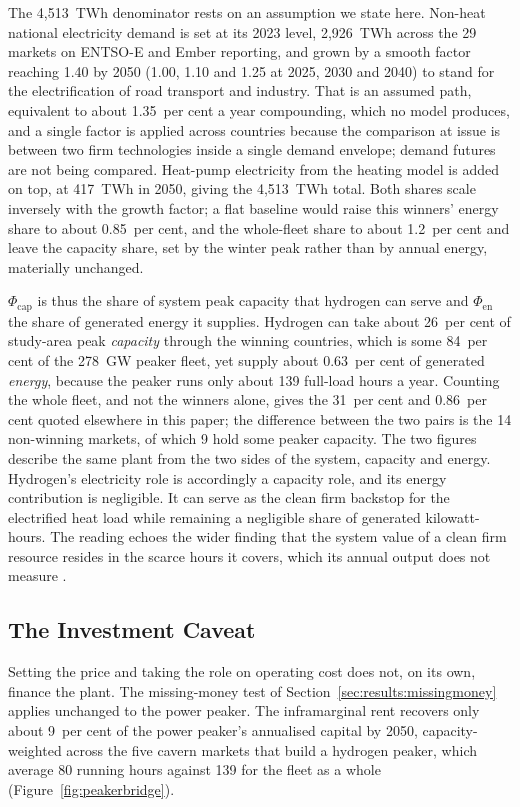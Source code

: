 The 4{,}513~TWh denominator rests on an assumption we state here.
Non-heat national electricity demand is set at its 2023 level, 2{,}926~TWh across the 29
markets on ENTSO-E and Ember reporting, and grown by a smooth factor reaching 1.40 by 2050
(1.00, 1.10 and 1.25 at 2025, 2030 and 2040) to stand for the electrification of road
transport and industry. That is an assumed path, equivalent to about 1.35~per cent a year compounding, which no model produces, and a single factor is applied across countries because
the comparison at issue is between two firm technologies inside a single demand envelope; demand futures are not being compared. Heat-pump electricity from the heating model is added on top,
at 417~TWh in 2050, giving the 4{,}513~TWh total. Both shares scale inversely with the
growth factor; a flat baseline would raise this winners' energy share to about 0.85~per cent, and the whole-fleet share to about 1.2~per cent and leave
the capacity share, set by the winter peak rather than by annual energy, materially
unchanged.

$\Phi_{\text{cap}}$ is thus the share of system peak capacity that hydrogen can serve and
$\Phi_{\text{en}}$ the share of generated energy it supplies. Hydrogen can take
about 26~per cent of study-area peak \emph{capacity} through the winning countries, which is some
84~per cent of the 278~GW peaker fleet, yet supply about 0.63~per cent of generated
\emph{energy}, because the peaker runs only about 139 full-load hours a year. Counting the whole fleet, and not the winners alone, gives the 31~per cent and 0.86~per cent quoted elsewhere in
this paper; the difference between the two pairs is the 14 non-winning markets, of
which 9 hold some peaker capacity. The two figures describe the same plant from the two sides of the system, capacity and energy. Hydrogen's electricity role is
accordingly a capacity role, and its energy contribution is negligible. It can serve as the clean firm backstop for the
electrified heat load while remaining a negligible share of generated kilowatt-hours. The reading
echoes the wider finding that the system value of a clean firm resource resides in the scarce hours it covers, which its annual output does not measure \citep{Bistline2020ValueOfTechnology, Quarton2019Value}.

\subsection{The Investment Caveat}
\label{sec:power:caveat}

Setting the price and taking the role on operating cost does not, on its own, finance the plant.
The missing-money test of Section~\ref{sec:results:missingmoney} applies unchanged to
the power peaker. The inframarginal rent recovers only about 9~per cent of the power
peaker's annualised capital by 2050, capacity-weighted across the five cavern markets
that build a hydrogen peaker, which average 80 running hours against 139 for the fleet as a whole
(Figure~\ref{fig:peakerbridge}).


